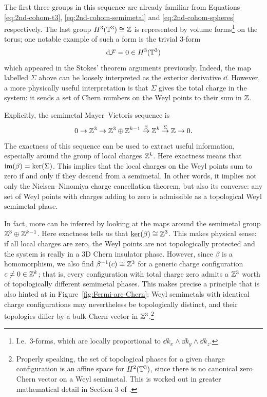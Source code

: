 The first three groups in this sequence are already familiar from Equations \eqref{eq:2nd-cohom-t3}, \eqref{eq:2nd-cohom-semimetal} and \eqref{eq:2nd-cohom-spheres} respectively. The last group $H^3(\mathbb{T}^3)\cong\mathbb{Z}$ is represented by volume forms\footnote{
	I.e.\ 3-forms, which are locally proportional to $\dd{k_x}\wedge\dd{k_y}\wedge\dd{k_z}$.}
on the torus; one notable example of such a form is the trivial 3-form
\begin{equation*}
	\dd{\mathcal{F}} = 0 \in H^3(\mathbb{T}^3)
\end{equation*}
which appeared in the Stokes' theorem arguments previously. Indeed, the map labelled $\Sigma$ above can be loosely interpreted as the exterior derivative $\dd$. However, a more physically useful interpretation is that $\Sigma$ gives the total charge in the system: it sends a set of Chern numbers on the Weyl points to their sum in $\mathbb{Z}$.

Explicitly, the semimetal Mayer--Vietoris sequence is
\begin{equation}\label{eq:semimetal-MV-explicit}
	0 \to \mathbb{Z}^3 \to \mathbb{Z}^3\oplus\mathbb{Z}^{k-1} \overset{\beta}{\to} \mathbb{Z}^k \overset{\Sigma}{\to} \mathbb{Z} \to 0.
\end{equation}
The exactness of this sequence can be used to extract useful information, especially around the group of local charges $\mathbb{Z}^k$. Here exactness means that $\operatorname{im}(\beta) = \ker(\Sigma)$. This implies that the local charges on the Weyl points sum to zero if and only if they descend from a semimetal. In other words, it implies not only the Nielsen--Ninomiya charge cancellation theorem, but also its converse: any set of Weyl points with charges adding to zero is admissible as a topological Weyl semimetal phase.

In fact, more can be inferred by looking at the maps around the semimetal group $\mathbb{Z}^3\oplus\mathbb{Z}^{k-1}$. Here exactness tells us that $\ker(\beta)\cong\mathbb{Z}^3$. This makes physical sense: if all local charges are zero, the Weyl points are not topologically protected and the system is really in a 3D Chern insulator phase. However, since $\beta$ is a homomorphism, we also find $\beta^{-1}(c)\cong\mathbb{Z}^3$ for a generic charge configuration $c\neq 0\in\mathbb{Z}^k$; that is, every configuration with total charge zero admits a $\mathbb{Z}^3$ worth of topologically different semimetal phases. This makes precise a principle that is also hinted at in Figure~\ref{fig:Fermi-arc-Chern}: Weyl semimetals with identical charge configurations may nevertheless be topologically distinct, and their topologies differ by a bulk Chern vector in $\mathbb{Z}^3$.\footnote{
	Properly speaking, the set of topological phases for a given charge configuration is an affine space for $H^2(\mathbb{T}^3)$, since there is no canonical zero Chern vector on a Weyl semimetal. This is worked out in greater mathematical detail in Section 3 of \cite{Mathai_math-review}.}



